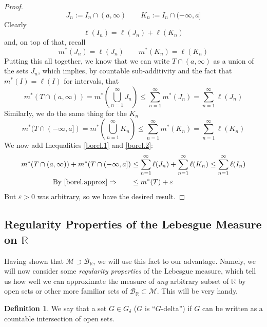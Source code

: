 \documentclass[12pt]{article}
\theoremstyle{plain}
\theoremstyle{definition}
\newtheorem{defn}[thm]{Definition}
\theoremstyle{remark}
\begin{document}
\begin{proof}
\[
    J_n := I_n \cap (a,\infty)
    \qquad
    K_n := I_n \cap (-\infty,a]
\]
Clearly
\[
    \ell(I_n) = \ell(J_n) + \ell(K_n)
\]
and, on top of that, recall 
\[
    m^*(J_n) = \ell(J_n) 
    \qquad
    m^*(K_n) = \ell(K_n) 
\]
Putting this all together, we know that we can write $T\cap (a,\infty)$ as a union of the sets $J_n$, which implies, by countable sub-additivity and the fact that $m^*(I) = \ell(I)$ for intervals, that
\begin{equation}
    \label{borel.1}
    m^*(T \cap (a,\infty)) =
    m^*\left(\bigcup^\infty_{n=1} J_n\right) 
    \leq \sum^\infty_{n=1}
    m^*(J_n) = \sum^\infty_{n=1} \ell(J_n)
\end{equation}
Similarly, we do the same thing for the $K_n$
\begin{equation}
    \label{borel.2}
    m^*(T \cap (-\infty,a]) =
    m^*\left(\bigcup^\infty_{n=1} K_n\right) 
    \leq \sum^\infty_{n=1}
    m^*(K_n) = \sum^\infty_{n=1} \ell(K_n)
\end{equation}
We now add Inequalities \ref{borel.1} and \ref{borel.2}:
\begin{align*}
    m^*(T \cap (a,\infty)) +
    m^*(T \cap (-\infty,a]) &\leq
    \sum^\infty_{n=1} \ell(J_n)
    + \sum^\infty_{n=1} \ell(K_n) 
    \leq \sum^\infty_{n=1} \ell(I_n) \\
    \text{By \ref{borel.approx}} \Rightarrow
    \qquad &\leq m^*(T) + \varepsilon
\end{align*}
But $\varepsilon>0$ was arbitrary, so we have the desired result.
\end{proof}


\subsection{Regularity Properties of the Lebesgue Measure on $\mathbb{R}$\label{sec.support1}}


Having shown that $\mathscr{M}\supset \mathscr{B}_\mathbb{R}$, we will use this fact to our advantage. Namely, we will now consider some \emph{regularity properties} of the Lebesgue measure, which tell us how well we can approximate the measure of \emph{any} arbitrary subset of $\mathbb{R}$ by open sets or other more familiar sets of $\mathscr{B}_\mathbb{R}\subset\mathscr{M}$. This will be very handy.

\begin{defn}
We say that a set $G\in G_\delta$ ($G$ is ``$G$-delta'') if $G$ can be written as a countable intersection of open sets.
\end{defn}
\end{document}
